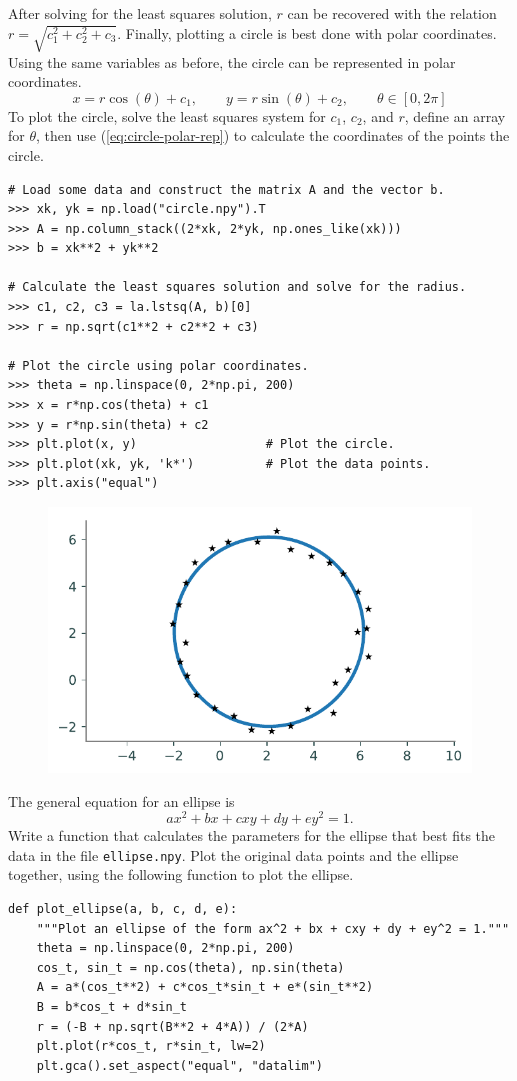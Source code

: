 After solving for the least squares solution, $r$ can be recovered with the relation $r = \sqrt{c_1^2 + c_2^2 + c_3}$.
Finally, plotting a circle is best done with polar coordinates.
Using the same variables as before, the circle can be represented in polar coordinates.
\begin{equation}
x = r\cos(\theta) + c_1, \qquad
y = r\sin(\theta) + c_2, \qquad
\theta\in [0,2\pi]
\label{eq:circle-polar-rep}
\end{equation}
To plot the circle, solve the least squares system for $c_1$, $c_2$, and $r$, define an array for $\theta$, then use (\ref{eq:circle-polar-rep}) to calculate the coordinates of the points the circle.

\begin{lstlisting}
# Load some data and construct the matrix A and the vector b.
>>> xk, yk = np.load("circle.npy").T
>>> A = np.column_stack((2*xk, 2*yk, np.ones_like(xk)))
>>> b = xk**2 + yk**2

# Calculate the least squares solution and solve for the radius.
>>> c1, c2, c3 = la.lstsq(A, b)[0]
>>> r = np.sqrt(c1**2 + c2**2 + c3)

# Plot the circle using polar coordinates.
>>> theta = np.linspace(0, 2*np.pi, 200)
>>> x = r*np.cos(theta) + c1
>>> y = r*np.sin(theta) + c2
>>> plt.plot(x, y)                  # Plot the circle.
>>> plt.plot(xk, yk, 'k*')          # Plot the data points.
>>> plt.axis("equal")
\end{lstlisting}

\begin{figure}[H]
    \includegraphics[width=.7\textwidth]{figures/circle_fit_example.pdf}
\end{figure}

\begin{problem}
The general equation for an ellipse is \[ax^2 + bx + cxy + dy + ey^2 = 1.\]
Write a function that calculates the parameters for the ellipse that best fits the data in the file \texttt{ellipse.npy}.
Plot the original data points and the ellipse together, using the following function to plot the ellipse.

\begin{lstlisting}
def plot_ellipse(a, b, c, d, e):
    """Plot an ellipse of the form ax^2 + bx + cxy + dy + ey^2 = 1."""
    theta = np.linspace(0, 2*np.pi, 200)
    cos_t, sin_t = np.cos(theta), np.sin(theta)
    A = a*(cos_t**2) + c*cos_t*sin_t + e*(sin_t**2)
    B = b*cos_t + d*sin_t
    r = (-B + np.sqrt(B**2 + 4*A)) / (2*A)
    plt.plot(r*cos_t, r*sin_t, lw=2)
    plt.gca().set_aspect("equal", "datalim")
\end{lstlisting}
\end{problem}

